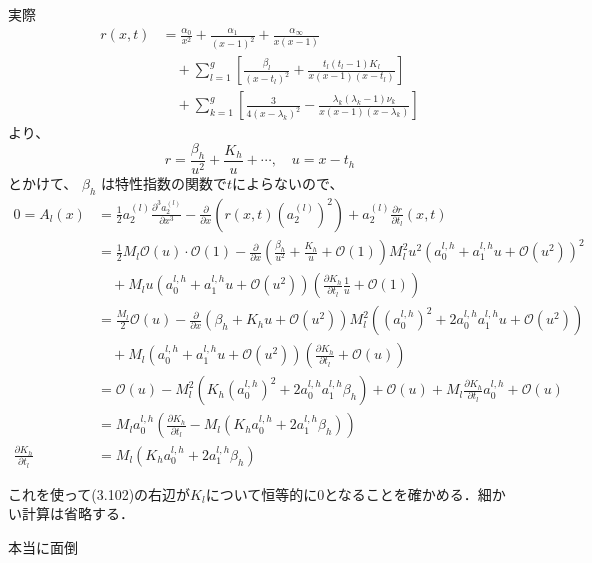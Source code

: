 \documentclass[paper=a4, fontsize=11pt]{jlreq} %
\newenvironment{story}{%
  \begin{mdframed}[
    backgroundcolor=red!5, %
    linewidth=0pt,         %
    innertopmargin=10pt,   %
    innerbottommargin=10pt,
    innerrightmargin=10pt, %
    innerleftmargin=10pt
  ]%
}{%
  \end{mdframed}%
}
\theoremstyle{break}
\theoremstyle{qa}
\begin{document}
実際
\begin{align*}
    r(x,t) &= \frac{\alpha_0}{x^2} + \frac{\alpha_1}{(x-1)^2} + \frac{\alpha_\infty}{x(x-1)} \nonumber \\
    &\quad + \sum_{l=1}^g \left[ \frac{\beta_l}{(x-t_l)^2} + \frac{t_l(t_l-1)K_l}{x(x-1)(x-t_l)} \right]\\
    &\quad + \sum_{k=1}^g \left[ \frac{3}{4(x-\lambda_k)^2} - \frac{\lambda_k(\lambda_k-1)\nu_k}{x(x-1)(x-\lambda_k)} \right] 
\end{align*}
より、
\begin{equation*}
    r = \frac{\beta_h}{u^2} + \frac{K_h}{u} + \cdots, \quad u = x - t_h
\end{equation*}
とかけて、 $\beta_h$ は特性指数の関数で$t$によらないので、
\begin{align*}
    0 = A_l(x) &= \frac{1}{2} a_2^{(l)} \frac{\partial^3 a_2^{(l)}}{\partial x^3} - \frac{\partial}{\partial x} \left( r(x,t) (a_2^{(l)})^2 \right) + a_2^{(l)} \frac{\partial r}{\partial t_l}(x,t) \\
    &= \frac{1}{2} M_l \mathcal{O}(u) \cdot \mathcal{O}(1) - \frac{\partial}{\partial x} \left( \frac{\beta_h}{u^2} + \frac{K_h}{u} + \mathcal{O}(1) \right) M_l^2 u^2 (a_0^{l,h} + a_1^{l,h} u + \mathcal{O}(u^2))^2 \\
    &\quad + M_l u (a_0^{l,h} + a_1^{l,h} u + \mathcal{O}(u^2)) \left( \frac{\partial K_h}{\partial t_l} \frac{1}{u} + \mathcal{O}(1) \right) \\
    &= \frac{M_l}{2} \mathcal{O}(u) - \frac{\partial}{\partial x} \left( \beta_h + K_h u + \mathcal{O}(u^2) \right) M_l^2 \left( (a_0^{l,h})^2 + 2 a_0^{l,h} a_1^{l,h} u + \mathcal{O}(u^2) \right) \\
    &\quad + M_l (a_0^{l,h} + a_1^{l,h} u + \mathcal{O}(u^2)) \left( \frac{\partial K_h}{\partial t_l} + \mathcal{O}(u) \right) \\
    &= \mathcal{O}(u) - M_l^2 \left( K_h (a_0^{l,h})^2 + 2 a_0^{l,h} a_1^{l,h} \beta_h \right) + \mathcal{O}(u) + M_l \frac{\partial K_h}{\partial t_l} a_0^{l,h} + \mathcal{O}(u) \\
    &= M_l a_0^{l,h} \left( \frac{\partial K_h}{\partial t_l} - M_l \left( K_h a_0^{l,h} + 2 a_1^{l,h} \beta_h \right) \right) \\
    \frac{\partial K_h}{\partial t_l} &= M_l \left( K_h a_0^{l,h} + 2 a_1^{l,h} \beta_h \right)
\end{align*}
\begin{story}
これを使って(3.102)の右辺が$K_l$について恒等的に0となることを確かめる．細かい計算は省略する．
\end{story}
本当に面倒
\end{document}
